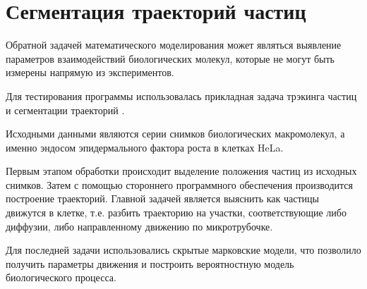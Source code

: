 \section*{Сегментация траекторий частиц}

Обратной задачей математического моделирования
может являться выявление параметров взаимодействий биологических молекул,
которые не могут быть измерены напрямую из экспериментов.

Для тестирования программы использовалась
прикладная задача трэкинга частиц
и сегментации траекторий \cite{track}.

Исходными данными являются
серии снимков биологических макромолекул,
а именно эндосом эпидермального фактора роста
в клетках HeLa.

Первым этапом обработки происходит выделение
положения частиц из исходных снимков.
Затем с помощью стороннего программного обеспечения
производится построение траекторий.
Главной задачей является выяснить
как частицы движутся в клетке,
т.е. разбить траекторию на участки,
соответствующие либо диффузии,
либо направленному движению по микротрубочке.

Для последней задачи использовались
скрытые марковские модели,
что позволило получить
параметры движения и
построить вероятностную модель
биологического процесса.

